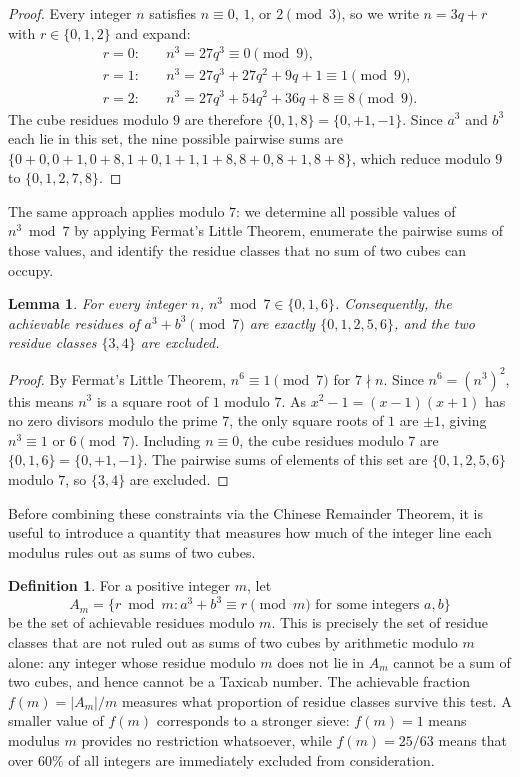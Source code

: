 \documentclass[12pt]{amsart}
\newtheorem{lemma}{Lemma}
\theoremstyle{definition}
\newtheorem{definition}{Definition}
\theoremstyle{remark}
\begin{document}
\begin{proof}
Every integer $n$ satisfies $n \equiv 0$, $1$, or $2 \pmod{3}$, so we
write $n = 3q + r$ with $r \in \{0, 1, 2\}$ and expand:
\begin{align*}
r = 0: &\quad n^3 = 27q^3 \equiv 0 \pmod{9},\\
r = 1: &\quad n^3 = 27q^3 + 27q^2 + 9q + 1 \equiv 1 \pmod{9},\\
r = 2: &\quad n^3 = 27q^3 + 54q^2 + 36q + 8 \equiv 8 \pmod{9}.
\end{align*}
The cube residues modulo $9$ are therefore $\{0, 1, 8\} = \{0, +1, -1\}$.
Since $a^3$ and $b^3$ each lie in this set, the nine possible pairwise
sums are $\{0+0, 0+1, 0+8, 1+0, 1+1, 1+8, 8+0, 8+1, 8+8\}$, which
reduce modulo $9$ to $\{0, 1, 2, 7, 8\}$.
\end{proof}

The same approach applies modulo $7$: we determine all possible 
values of $n^3 \bmod 7$ by applying Fermat's Little Theorem, 
enumerate the pairwise sums of those values, and identify the 
residue classes that no sum of two cubes can occupy.

\begin{lemma}\label{lem:cubes-mod7}
For every integer $n$, $n^3 \bmod 7 \in \{0, 1, 6\}$. Consequently, the
achievable residues of $a^3 + b^3 \pmod{7}$ are exactly $\{0,1,2,5,6\}$,
and the two residue classes $\{3,4\}$ are excluded.
\end{lemma}

\begin{proof}
By Fermat's Little Theorem, $n^6 \equiv 1 \pmod{7}$ for $7 \nmid n$.
Since $n^6 = (n^3)^2$, this means $n^3$ is a square root of $1$ modulo
$7$. As $x^2 - 1 = (x-1)(x+1)$ has no zero divisors modulo the prime
$7$, the only square roots of $1$ are $\pm 1$, giving $n^3 \equiv 1$ or
$6 \pmod{7}$. Including $n \equiv 0$, the cube residues modulo $7$ are
$\{0, 1, 6\} = \{0, +1, -1\}$. The pairwise sums of elements of this
set are $\{0, 1, 2, 5, 6\}$ modulo $7$, so $\{3, 4\}$ are excluded.
\end{proof}

Before combining these constraints via the Chinese Remainder Theorem, 
it is useful to introduce a quantity that measures how much of the 
integer line each modulus rules out as sums of two cubes.

\begin{definition}\label{def:achievable}
For a positive integer $m$, let
\[
  A_m = \{r \bmod m : a^3 + b^3 \equiv r \pmod{m}
  \text{ for some integers } a, b\}
\]
be the set of achievable residues modulo $m$. This is precisely the set
of residue classes that are not ruled out as sums of two cubes by
arithmetic modulo $m$ alone: any integer whose residue modulo $m$ does
not lie in $A_m$ cannot be a sum of two cubes, and hence cannot be a
Taxicab number. The achievable fraction $f(m) = |A_m|/m$ measures what
proportion of residue classes survive this test. A smaller value of
$f(m)$ corresponds to a stronger sieve: $f(m) = 1$ means modulus $m$
provides no restriction whatsoever, while $f(m) = 25/63$ means that over
$60\%$ of all integers are immediately excluded from consideration.
\end{definition}
\end{document}
